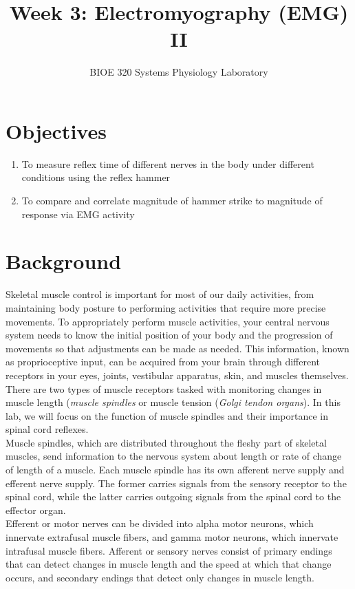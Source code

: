 \documentclass{article}
\title{Week 3: Electromyography (EMG) II}
\author{BIOE 320 Systems Physiology Laboratory}
\date{}
\begin{document}
\large
\maketitle

\section*{Objectives}
\begin{enumerate}
	\item To measure reflex time of different nerves in the body under different conditions using the reflex hammer
	\item To compare and correlate magnitude of hammer strike to magnitude of response via EMG activity
\end{enumerate}

\section*{Background}
Skeletal muscle control is important for most of our daily activities, from maintaining body posture to performing activities that require more precise movements. To appropriately perform muscle activities, your central nervous system needs to know the initial position of your body and the progression of movements so that adjustments can be made as needed. This information, known as proprioceptive input, can be acquired from your brain through different receptors in your eyes, joints, vestibular apparatus, skin, and muscles themselves. There are two types of muscle receptors tasked with monitoring changes in muscle length (\textit{muscle spindles} or muscle tension (\textit{Golgi tendon organs}). In this lab, we will focus on the function of muscle spindles and their importance in spinal cord reflexes.\\

Muscle spindles, which are distributed throughout the fleshy part of skeletal muscles, send information to the nervous system about length or rate of change of length of a muscle. Each muscle spindle has its own afferent nerve supply and efferent nerve supply. The former carries signals from the sensory receptor to the spinal cord, while the latter carries outgoing signals from the spinal cord to the effector organ.\\

Efferent or motor nerves can be divided into alpha motor neurons, which innervate extrafusal muscle fibers, and gamma motor neurons, which innervate intrafusal muscle fibers. Afferent or sensory nerves consist of primary endings that can detect changes in muscle length and the speed at which that change occurs, and secondary endings that detect only changes in muscle length.\\
\end{document}
